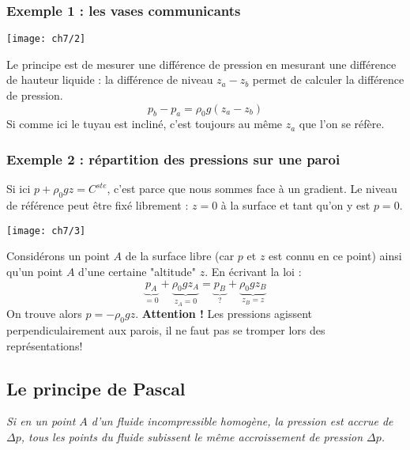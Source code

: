 \subsubsection{Exemple 1 : les vases communicants}
\begin{center}
	\texttt{[image: ch7/2]}
\end{center}
Le principe est de mesurer une différence de pression  en mesurant une 
différence de hauteur liquide : la différence de niveau $z_a-z_b$ permet 
de calculer la différence de pression.
\begin{equation}
	p_b-p_a = \rho_0g(z_a-z_b)
\end{equation}
Si comme ici le tuyau est incliné, c'est toujours au même $z_a$ que l'on 
se réfère.
		
\subsubsection{Exemple 2 : répartition des pressions sur une paroi}
Si ici $p+\rho_0gz = C^{ste}$, c'est parce que nous sommes face à un 
gradient. Le niveau de référence peut être fixé librement : $z=0$ à la 
surface et tant qu'on y est $p=0$.\\
\begin{center}
	\texttt{[image: ch7/3]}
\end{center}
 		
Considérons un point $A$ de la surface libre (car $p$ et $z$ est connu en ce
point) ainsi qu'un point $A$ d'une certaine "altitude" $z$. En écrivant la loi :
\begin{equation}
	\underbrace{p_A}_{=0} + \underbrace{\rho_0gz_A}_{z_A=0} = \underbrace{p_B}_{?} +
	\underbrace{\rho_0gz_B}_{z_B=z}
\end{equation}				
On trouve alors $p=-\rho_0gz$. \textbf{Attention !} Les pressions agissent 
perpendiculairement aux parois, il ne faut pas se tromper lors des représentations!
				
		
\subsection{Le principe de Pascal}
\textit{Si en un point $A$ d'un fluide incompressible homogène, la pression est 
	accrue de $\Delta p$, tous les points du fluide subissent le même accroissement de 
	pression $\Delta p$.}   
